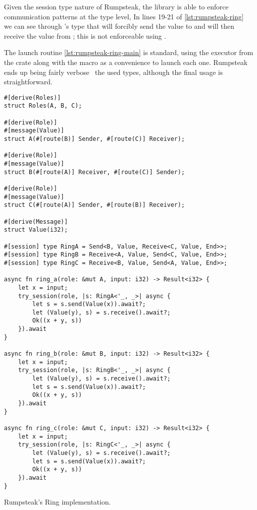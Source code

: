 Given the session type nature of Rumpsteak, the library is able to enforce communication patterns at the type level,
In lines 19-21 of \autoref{lst:rumpsteak-ring} we can see through 's type that
 will forcibly send the value to  and will then receive the value from ;
this is not enforceable using .

The launch routine \autoref{lst:rumpsteak-ring-main} is standard,
using the executor from the  crate along with the  macro as a convenience to launch each one.
Rumpsteak ends up being fairly verbose \wrt~the used types,
although the final usage  is straightforward.

\begin{listing}
    \centering
    \begin{verbatim}
#[derive(Roles)]
struct Roles(A, B, C);

#[derive(Role)]
#[message(Value)]
struct A(#[route(B)] Sender, #[route(C)] Receiver);

#[derive(Role)]
#[message(Value)]
struct B(#[route(A)] Receiver, #[route(C)] Sender);

#[derive(Role)]
#[message(Value)]
struct C(#[route(A)] Sender, #[route(B)] Receiver);

#[derive(Message)]
struct Value(i32);

#[session] type RingA = Send<B, Value, Receive<C, Value, End>>;
#[session] type RingB = Receive<A, Value, Send<C, Value, End>>;
#[session] type RingC = Receive<B, Value, Send<A, Value, End>>;

async fn ring_a(role: &mut A, input: i32) -> Result<i32> {
    let x = input;
    try_session(role, |s: RingA<'_, _>| async {
        let s = s.send(Value(x)).await?;
        let (Value(y), s) = s.receive().await?;
        Ok((x + y, s))
    }).await
}

async fn ring_b(role: &mut B, input: i32) -> Result<i32> {
    let x = input;
    try_session(role, |s: RingB<'_, _>| async {
        let (Value(y), s) = s.receive().await?;
        let s = s.send(Value(x)).await?;
        Ok((x + y, s))
    }).await
}

async fn ring_c(role: &mut C, input: i32) -> Result<i32> {
    let x = input;
    try_session(role, |s: RingC<'_, _>| async {
        let (Value(y), s) = s.receive().await?;
        let s = s.send(Value(x)).await?;
        Ok((x + y, s))
    }).await
}
    \end{verbatim}
    \caption{Rumpsteak's Ring implementation.}
    \label{lst:rumpsteak-ring}
\end{listing}

